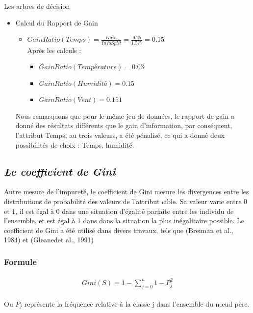 \documentclass[a4paper, 11pt]{report}
\begin{document}
\begin{chapter}{Les arbres de décision}
\begin{itemize}
\begin{itemize}
\begin{itemize}
\end{itemize}

\item Calcul du Rapport de Gain\\
\begin{itemize}
\item $GainRatio(Temps) =\frac{Gain}{InfoSplit} = \frac{0.25}{1.577} = 0.15 $\\ 
Après les calculs :
\begin{itemize}
\item $GainRatio(Température)  = 0.03$  
\item $GainRatio(Humidité)  = 0.15$ 
\item $GainRatio(Vent)  = 0.151$
\end{itemize}
\end{itemize}
Nous remarquons que pour le même jeu de données, le rapport de gain a donné des résultats différents que le gain d'information, par conséquent, l'attribut Temps, au trois valeurs, a été pénalisé, ce qui a donné deux possibilités de choix : Temps, humidité.
\end{itemize}

\end{itemize}


\subsection*{\emph{Le coefficient de Gini}}
Autre mesure de l'impureté, le coefficient de Gini mesure les divergences entre les distributions de probabilité des valeurs de l'attribut cible. Sa valeur varie entre 0 et 1, il est égal à 0 dans une situation d'égalité parfaite entre les individu de l'ensemble, et est égal à 1 dans dans la situation la plus inégalitaire possible. Le coefficient de Gini a été utilisé dans divers travaux, tels que (Breiman et al., 1984) et (Gleanedet al., 1991)\cite{singh2014comparative}
\subsubsection*{Formule}
\begin{align}
\begin{split}\label{formule:Gini}
Gini(S) = 1-\sum\limits_{j=0}^n 1- P_j^2\end{split}
\end{align}

Ou $P_j$ représente la fréquence relative à la classe j dans l'ensemble du nœud père.

\end{chapter}
\end{document}

